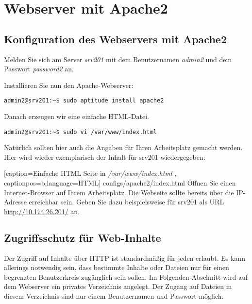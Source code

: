 \section{Webserver mit Apache2}

\subsection{Konfiguration des Webservers mit Apache2}
Melden Sie sich am Server \textit{srv201} mit dem Benutzernamen \textit{admin2}
und dem Passwort \textit{password2} an.

Installieren Sie nun den Apache-Webserver:
\begin{lstlisting}
admin2@srv201:~$ sudo aptitude install apache2
\end{lstlisting}
Danach erzeugen wir eine einfache HTML-Datei.
\begin{lstlisting}
admin2@srv201:~$ sudo vi /var/www/index.html
\end{lstlisting}
Natürlich sollten hier auch die Angaben für Ihren Arbeitsplatz gemacht werden. Hier wird wieder exemplarisch 
der Inhalt für srv201 wiedergegeben:

    [caption={Einfache HTML Seite in \textit{/var/www/index.html}}
       \label{lst:index.html},
       captionpos=b,language=HTML]
{configs/apache2/index.html}
Öffnen Sie einen Internet-Browser auf Ihrem Arbeitsplatz. Die Webseite sollte bereits über die IP-Adresse erreichbar sein. Geben Sie dazu
beispielsweise für srv201 als URL\\
\url{http://10.174.26.201/} an.

\subsection{Zugriffsschutz für Web-Inhalte}
Der Zugriff auf Inhalte über HTTP ist standardmäßig für jeden erlaubt. Es kann
allerings notwendig sein, dass bestimmte Inhalte oder Dateien nur für einen
begrenzten Benutzerkreis zugänglich sein sollen. Im Folgenden Abschnitt wird auf
dem Webserver ein privates Verzeichnis angelegt. Der Zugang auf Dateien in
diesem Verzeichnis sind nur einem Benutzernamen und Passwort möglich.

